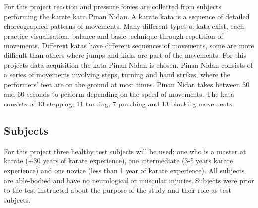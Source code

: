 

For this project reaction and pressure forces are collected from subjects performing the karate kata Pinan Nidan. %
A karate kata is a sequence of detailed choreographed patterns of movements. Many different types of kata exist, each practice visualisation, balance and basic technique through repetition of movements. Different katas have different sequences of movements, some are more difficult than others where jumps and kicks are part of the movements. For this projects data acquisition the kata Pinan Nidan is chosen. 
Pinan Nidan consists of a series of movements involving steps, turning and hand strikes, where the performers' feet are on the ground at most times. Pinan Nidan takes between 30 and 60 seconds to perform depending on the speed of movements. The kata consists of 13 stepping, 11 turning, 7 punching and 13 blocking movements. \cite{Mccarthy1987, seikenryu2017, Dojo2018}

\subsection{Subjects} %
For this project three healthy test subjects will be used; one who is a master at karate (+30 years of karate experience), one intermediate (3-5 years karate experience) and one novice (less than 1 year of karate experience). All subjects are able-bodied and have no neurological or muscular injuries. Subjects were prior to the test instructed about the purpose of the study and their role as test subjects.






